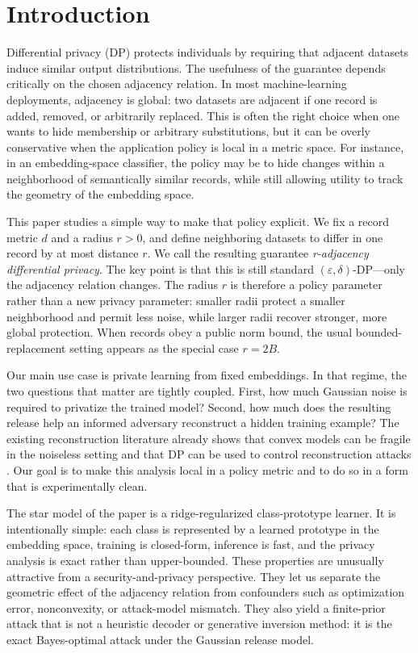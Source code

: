 \documentclass[conference,compsoc]{IEEEtran}
\begin{document}
\section{Introduction}
Differential privacy (DP) protects individuals by requiring that adjacent datasets induce similar output distributions. The usefulness of the guarantee depends critically on the chosen adjacency relation. In most machine-learning deployments, adjacency is global: two datasets are adjacent if one record is added, removed, or arbitrarily replaced. This is often the right choice when one wants to hide membership or arbitrary substitutions, but it can be overly conservative when the application policy is local in a metric space. For instance, in an embedding-space classifier, the policy may be to hide changes within a neighborhood of semantically similar records, while still allowing utility to track the geometry of the embedding space.

This paper studies a simple way to make that policy explicit. We fix a record metric $d$ and a radius $r>0$, and define neighboring datasets to differ in one record by at most distance $r$. We call the resulting guarantee \emph{r-adjacency differential privacy}. The key point is that this is still standard $(\varepsilon,\delta)$-DP---only the adjacency relation changes. The radius $r$ is therefore a policy parameter rather than a new privacy parameter: smaller radii protect a smaller neighborhood and permit less noise, while larger radii recover stronger, more global protection. When records obey a public norm bound, the usual bounded-replacement setting appears as the special case $r=2B$.

Our main use case is private learning from fixed embeddings. In that regime, the two questions that matter are tightly coupled. First, how much Gaussian noise is required to privatize the trained model? Second, how much does the resulting release help an informed adversary reconstruct a hidden training example? The existing reconstruction literature already shows that convex models can be fragile in the noiseless setting and that DP can be used to control reconstruction attacks \cite{balle2022informed,hayes2023bounding}. Our goal is to make this analysis local in a policy metric and to do so in a form that is experimentally clean.

The star model of the paper is a ridge-regularized class-prototype learner. It is intentionally simple: each class is represented by a learned prototype in the embedding space, training is closed-form, inference is fast, and the privacy analysis is exact rather than upper-bounded. These properties are unusually attractive from a security-and-privacy perspective. They let us separate the geometric effect of the adjacency relation from confounders such as optimization error, nonconvexity, or attack-model mismatch. They also yield a finite-prior attack that is not a heuristic decoder or generative inversion method: it is the exact Bayes-optimal attack under the Gaussian release model.
\end{document}
